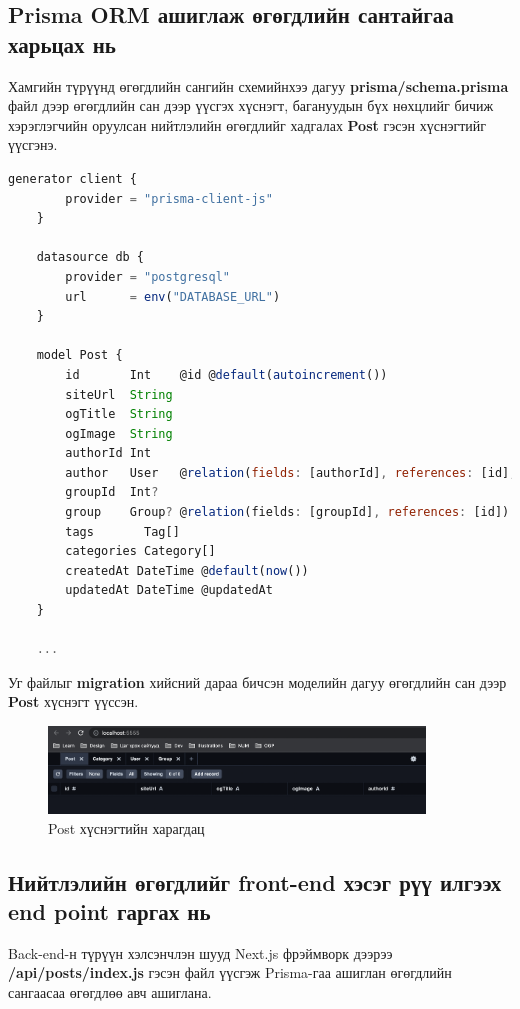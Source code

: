 \subsection{Prisma ORM ашиглаж өгөгдлийн сантайгаа харьцах нь}

Хамгийн түрүүнд өгөгдлийн сангийн схемийнхээ дагуу \textbf{prisma/schema.prisma} файл дээр өгөгдлийн сан дээр үүсгэх хүснэгт, багануудын бүх нөхцлийг бичиж хэрэглэгчийн оруулсан нийтлэлийн өгөгдлийг хадгалах \textbf{Post} гэсэн хүснэгтийг үүсгэнэ.

\begin{lstlisting}[language=Javascript, caption=Өгөгдлийн сангийн хүснэгтийг Prisma ашиглан үүсгэх, frame=single]
	generator client {
		provider = "prisma-client-js"
	}
	
	datasource db {
		provider = "postgresql"
		url      = env("DATABASE_URL")
	}
	
	model Post {
		id       Int    @id @default(autoincrement())
		siteUrl  String
		ogTitle  String
		ogImage  String
		authorId Int
		author   User   @relation(fields: [authorId], references: [id], onDelete: Cascade)
		groupId  Int?
		group    Group? @relation(fields: [groupId], references: [id])
		tags       Tag[]
		categories Category[]
		createdAt DateTime @default(now())
		updatedAt DateTime @updatedAt
	}	

	...

\end{lstlisting}

Уг файлыг \textbf{migration} хийсний дараа бичсэн моделийн дагуу өгөгдлийн сан дээр \textbf{Post} хүснэгт үүссэн. 

\begin{figure}[h]
	\centering
	\includegraphics[width=10cm]{images/implement/table.png}
	\caption{Post хүснэгтийн харагдац}
	\label{fig:table}
\end{figure}

\subsection{Нийтлэлийн өгөгдлийг front-end хэсэг рүү илгээх end point гаргах нь}

Back-end-н түрүүн хэлсэнчлэн шууд Next.js фрэймворк дээрээ \textbf{/api/posts/index.js} гэсэн файл үүсгэж Prisma-гаа ашиглан өгөгдлийн сангаасаа өгөгдлөө авч ашиглана.

